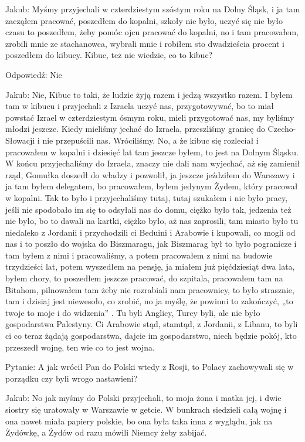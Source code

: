 Jakub: Myśmy przyjechali w czterdziestym szóstym roku na Dolny Śląsk, i ja tam zacząłem pracować, poszedłem do kopalni, szkoły nie było, uczyć się nie było czasu to poszedłem, żeby pomóc ojcu pracować do kopalni, no i tam pracowałem, zrobili mnie ze stachanowca, wybrali mnie i robiłem sto dwadzieścia  procent i poszedłem do kibucy. Kibuc, też nie wiedzie, co to kibuc? 

Odpowiedź: Nie 

Jakub: Nie, Kibuc to taki, że ludzie żyją razem i jedzą wszystko razem. I byłem tam w kibucu                    i przyjechali z Izraela uczyć nas, przygotowywać, bo to miał powstać Izrael w czterdziestym ósmym roku, mieli przygotować nas, my byliśmy młodzi jeszcze. Kiedy mieliśmy jechać do Izraela, przeszliśmy granicę do Czecho-Słowacji i nie przepuścili nas. Wróciliśmy. No, a że kibuc się rozleciał i pracowałem w kopalni i dziesięć lat tam jeszcze byłem, to jest na Dolnym Śląsku. W końcu przyjechaliśmy do Izraela, znaczy nie dali nam wyjechać, aż się zamienił rząd, Gomułka doszedł do władzy i pozwolił, ja jeszcze jeździłem do Warszawy i ja tam byłem delegatem, bo pracowałem, byłem jedynym Żydem, który pracował w kopalni. Tak to było i przyjechaliśmy tutaj, tutaj szukałem i nie było pracy, jeśli nie spodobało im się to odsyłali nas do domu, ciężko było tak, jedzenia też nie było, bo to dawali na kartki, ciężko było, aż nas zaprosili, tam miasto było tu niedaleko z Jordanii i przychodzili ci Beduini      i Arabowie i kupowali, co mogli od nas i to poszło do wojska do Biszmaragu, jak Biszmarag był to było pogranicze i tam byłem z nimi i pracowaliśmy, a potem pracowałem z nimi na budowie trzydzieści lat, potem wyszedłem na pensję, ja miałem już pięćdziesiąt dwa lata, byłem chory, to poszedłem jeszcze pracować, do szpitala, pracowałem tam na Bitahom, pilnowałem tam żeby nie rozrabiali nam pracownicy, to było strasznie, tam i dzisiaj jest niewesoło, co zrobić, no ja myślę, że powinni to zakończyć, „to twoje to moje i do widzenia” . Tu byli Anglicy, Turcy byli, ale nie było gospodarstwa Palestyny. Ci Arabowie stąd, stamtąd, z Jordanii, z Libanu, to byli ci co teraz żądają  gospodarstwa, dajcie im gospodarstwo, niech będzie pokój, kto przeszedł wojnę, ten wie co to jest wojna. 

Pytanie: A jak wrócił Pan do Polski wtedy z Rosji, to Polacy zachowywali się w porządku czy byli wrogo nastawieni? 

 Jakub: No jak myśmy do Polski przyjechali, to moja żona i matka jej, i dwie siostry się uratowały        w Warszawie w getcie. W bunkrach siedzieli całą wojnę i ona nawet miała papiery polskie, bo ona była taka inna z wyglądu, jak na Żydówkę, a Żydów od razu mówili Niemcy żeby zabijać. 

